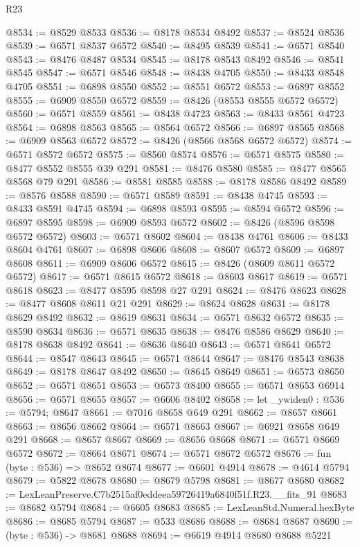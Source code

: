 \begin{lexlean}{R23}
\begin{coremodule}
@8534 := @8529 @8533
@8536 := @8178 @8534 @8492
@8537 := @8524 @8536
@8539 := @6571 @8537 @6572
@8540 := @8495 @8539
@8541 := @6571 @8540
@8543 := @8476 @8487 @8534
@8545 := @8178 @8543 @8492
@8546 := @8541 @8545
@8547 := @6571 @8546
@8548 := @8438 @4705
@8550 := @8433 @8548 @4705
@8551 := @6898 @8550
@8552 := @8551 @6572
@8553 := @6897 @8552
@8555 := @6909 @8550 @6572
@8559 := @8426 (@8553 @8555 @6572 @6572)
@8560 := @6571 @8559
@8561 := @8438 @4723
@8563 := @8433 @8561 @4723
@8564 := @6898 @8563
@8565 := @8564 @6572
@8566 := @6897 @8565
@8568 := @6909 @8563 @6572
@8572 := @8426 (@8566 @8568 @6572 @6572)
@8574 := @6571 @8572 @6572
@8575 := @8560 @8574
@8576 := @6571 @8575
@8580 := @8477 @8552 @8555 @39 @291
@8581 := @8476 @8580
@8585 := @8477 @8565 @8568 @79 @291
@8586 := @8581 @8585
@8588 := @8178 @8586 @8492
@8589 := @8576 @8588
@8590 := @6571 @8589
@8591 := @8438 @4745
@8593 := @8433 @8591 @4745
@8594 := @6898 @8593
@8595 := @8594 @6572
@8596 := @6897 @8595
@8598 := @6909 @8593 @6572
@8602 := @8426 (@8596 @8598 @6572 @6572)
@8603 := @6571 @8602
@8604 := @8438 @4761
@8606 := @8433 @8604 @4761
@8607 := @6898 @8606
@8608 := @8607 @6572
@8609 := @6897 @8608
@8611 := @6909 @8606 @6572
@8615 := @8426 (@8609 @8611 @6572 @6572)
@8617 := @6571 @8615 @6572
@8618 := @8603 @8617
@8619 := @6571 @8618
@8623 := @8477 @8595 @8598 @27 @291
@8624 := @8476 @8623
@8628 := @8477 @8608 @8611 @21 @291
@8629 := @8624 @8628
@8631 := @8178 @8629 @8492
@8632 := @8619 @8631
@8634 := @6571 @8632 @6572
@8635 := @8590 @8634
@8636 := @6571 @8635
@8638 := @8476 @8586 @8629
@8640 := @8178 @8638 @8492
@8641 := @8636 @8640
@8643 := @6571 @8641 @6572
@8644 := @8547 @8643
@8645 := @6571 @8644
@8647 := @8476 @8543 @8638
@8649 := @8178 @8647 @8492
@8650 := @8645 @8649
@8651 := @6573 @8650
@8652 := @6571 @8651
@8653 := @6573 @8400
@8655 := @6571 @8653 @6914
@8656 := @6571 @8655
@8657 := @6606 @8402
@8658 := let _ywiden0 : @536 := @5794; @8647
@8661 := @7016 @8658 @649 @291
@8662 := @8657 @8661
@8663 := @8656 @8662
@8664 := @6571 @8663
@8667 := @6921 @8658 @649 @291
@8668 := @8657 @8667
@8669 := @8656 @8668
@8671 := @6571 @8669 @6572
@8672 := @8664 @8671
@8674 := @6571 @8672 @6572
@8676 := fun (byte : @536) => @8652 @8674
@8677 := @6601 @4914
@8678 := @4614 @5794
@8679 := @5822 @8678
@8680 := @8679 @5798
@8681 := @8677 @8680
@8682 := LexLeanPreserve.C7b2515af0eddeea59726419a6840f51f.R23.__fits_91
@8683 := @8682 @5794
@8684 := @6605 @8683
@8685 := LexLeanStd.Numeral.hexByte
@8686 := @8685 @5794
@8687 := @533 @8686
@8688 := @8684 @8687
@8690 := (byte : @536) -> @8681 @8688
@8694 := @6619 @4914 @8680 @8688 @5221

\end{coremodule}
\end{lexlean}

